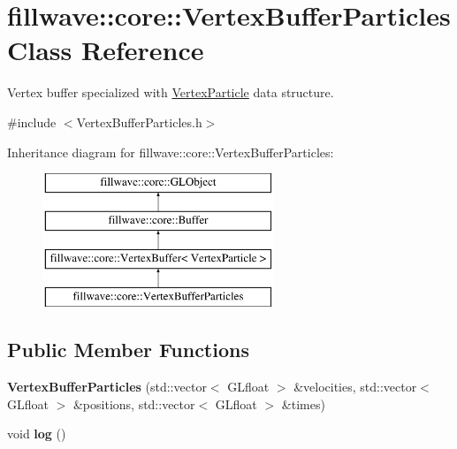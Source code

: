 \hypertarget{classfillwave_1_1core_1_1VertexBufferParticles}{}\section{fillwave\+:\+:core\+:\+:Vertex\+Buffer\+Particles Class Reference}
\label{classfillwave_1_1core_1_1VertexBufferParticles}


Vertex buffer specialized with \hyperlink{structfillwave_1_1core_1_1VertexParticle}{Vertex\+Particle} data structure.  




{\ttfamily \#include $<$Vertex\+Buffer\+Particles.\+h$>$}

Inheritance diagram for fillwave\+:\+:core\+:\+:Vertex\+Buffer\+Particles\+:\begin{figure}[H]
\begin{center}
\leavevmode
\includegraphics[height=4.000000cm]{classfillwave_1_1core_1_1VertexBufferParticles}
\end{center}
\end{figure}
\subsection*{Public Member Functions}
\begin{DoxyCompactItemize}
\item 
\hypertarget{classfillwave_1_1core_1_1VertexBufferParticles_aad12c6cc390efd3aa3f4463deceaa137}{}{\bfseries Vertex\+Buffer\+Particles} (std\+::vector$<$ G\+Lfloat $>$ \&velocities, std\+::vector$<$ G\+Lfloat $>$ \&positions, std\+::vector$<$ G\+Lfloat $>$ \&times)\label{classfillwave_1_1core_1_1VertexBufferParticles_aad12c6cc390efd3aa3f4463deceaa137}

\item 
\hypertarget{classfillwave_1_1core_1_1VertexBufferParticles_a06100abee5af4f2c7ff4c5dadebf0b4a}{}void {\bfseries log} ()\label{classfillwave_1_1core_1_1VertexBufferParticles_a06100abee5af4f2c7ff4c5dadebf0b4a}

\end{DoxyCompactItemize}
